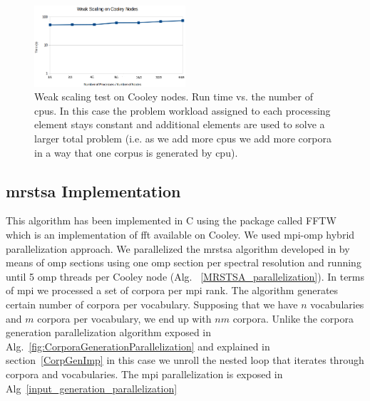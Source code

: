\documentclass[11pt,a4paper]{article}
\begin{document}
\begin{figure}[h!]
    \centering
    \includegraphics[width=0.5\textwidth]{CorporaGenerationWeakScaling.png}
    \caption{Weak scaling test on Cooley nodes. Run time vs. the number of \glspl{cpu}. In this case the problem workload assigned to each processing element stays constant and additional elements are used to solve a larger total problem (i.e. as we add more \glspl{cpu} we add more corpora in a way that one corpus is generated by \gls{cpu}).}
    \label{fig:CorporaGenerationWeakScaling}
\end{figure}
























\subsection{\gls{mrstsa} Implementation}

This algorithm has been implemented in C using the package called FFTW~\cite{fftw} which is an implementation of \gls{fft} available on Cooley. We used \gls{mpi}-\gls{omp} hybrid parallelization approach. We parallelized the \gls{mrstsa} algorithm developed in \cite{dematties2018} by means of \gls{omp} sections using one \gls{omp} section per spectral resolution and running until 5 \gls{omp} threads per Cooley node (Alg. ~\ref{MRSTSA_parallelization}). In terms of \gls{mpi} we processed a set of corpora per \gls{mpi} rank. The algorithm generates certain number of corpora per vocabulary. Supposing that we have $n$ vocabularies and $m$ corpora per vocabulary, we end up with $n m$ corpora. Unlike the corpora generation parallelization algorithm exposed in Alg.~\ref{fig:CorporaGenerationParallelization} and explained in section~\ref{CorpGenImp} in this case we unroll the nested loop that iterates through corpora and vocabularies. The \gls{mpi} parallelization is exposed in Alg~\ref{input_generation_parallelization}
\end{document}
